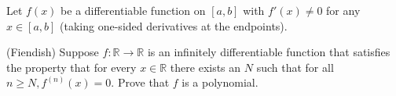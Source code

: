 \documentclass[answers]{exam}
\begin{document}
\begin{questions}
\question%
Let $f(x)$ be a differentiable function on $[a, b]$ with $f'(x) \neq 0$ for any $x \in[a, b]$ (taking one-sided derivatives at the endpoints).



\question%
(Fiendish) Suppose $f: \mathbb{R} \rightarrow \mathbb{R}$ is an infinitely differentiable function that satisfies the property that for every $x \in \mathbb{R}$ there exists an $N$ such that for all $n \geq N, f^{(n)}(x)=0$. Prove that $f$ is a polynomial.

\end{questions}
\end{document}

